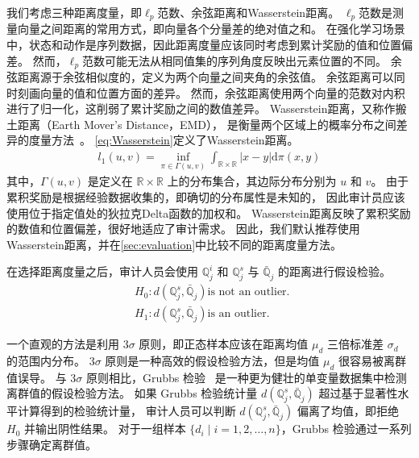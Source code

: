 我们考虑三种距离度量，即$\ell_p$范数、余弦距离和Wasserstein距离。
$\ell_p$范数是测量向量之间距离的常用方式，即向量各个分量差的绝对值之和。
在强化学习场景中，状态和动作是序列数据，因此距离度量应该同时考虑到累计奖励的值和位置偏差。
然而，$\ell_p$范数可能无法从相同值集的序列角度反映出元素位置的不同。
余弦距离源于余弦相似度的，定义为两个向量之间夹角的余弦值。
余弦距离可以同时刻画向量的值和位置方面的差异。
然而，余弦距离使用两个向量的范数对内积进行了归一化，这削弱了累计奖励之间的数值差异。
Wasserstein距离，又称作搬土距离（Earth Mover's Distance，EMD），
是衡量两个区域上的概率分布之间差异的度量方法~\cite{DBLP:conf/iccv/RubnerTG98}。
\autoref{eq:Wasserstein}定义了Wasserstein距离。
\begin{equation}
    \label{eq:Wasserstein}
    \begin{aligned}
    l_1(u, v)=\inf _{\pi \in \Gamma(u, v)} \int_{\mathbb{R} \times \mathbb{R}}|x-y| \mathrm{d} \pi(x, y)
    \end{aligned}
\end{equation}
其中，$\Gamma(u,v)$ 是定义在 $\mathbb{R} \times \mathbb{R}$ 上的分布集合，其边际分布分别为 $u$ 和 $v$。
由于累积奖励是根据经验数据收集的，即确切的分布属性是未知的，
因此审计员应该使用位于指定值处的狄拉克Delta函数的加权和。
Wasserstein距离反映了累积奖励的数值和位置偏差，很好地适应了审计需求。
因此，我们默认推荐使用Wasserstein距离，并在\autoref{sec:evaluation}中比较不同的距离度量方法。

在选择距离度量之后，审计人员会使用 $\mathbb{Q}_j^i$ 和 $\mathbb{Q}_j^s$ 与 $\bar{\mathbb{Q}}_j$ 的距离进行假设检验。
\begin{equation}
    \begin{aligned}
    &H_0: d(\mathbb{Q}_j^s, \bar{\mathbb{Q}}_j) \text{is not an outlier. }   \nonumber \\
    &H_1: d(\mathbb{Q}_j^s, \bar{\mathbb{Q}}_j) \text{is an outlier. }   \nonumber
    \end{aligned}
\end{equation}

一个直观的方法是利用 $3\sigma$ 原则，即正态样本应该在距离均值 $\mu_{d}$ 三倍标准差 $\sigma_{d}$ 的范围内分布。
$3\sigma$ 原则是一种高效的假设检验方法，但是均值 $\mu_{d}$ 很容易被离群值误导。
与 $3\sigma$ 原则相比，Grubbs 检验~\cite{grubbs1950sample} 是一种更为健壮的单变量数据集中检测离群值的假设检验方法。
如果 Grubbs 检验统计量 $d(\mathbb{Q}_j^s, \bar{\mathbb{Q}}_j)$ 超过基于显著性水平计算得到的检验统计量，
审计人员可以判断 $d(\mathbb{Q}_j^s, \bar{\mathbb{Q}}_j)$ 偏离了均值，即拒绝 $H_0$ 并输出阴性结果。
对于一组样本 $\{d_i \mid i=1,2,\dots,n\}$，Grubbs 检验通过一系列步骤确定离群值。

